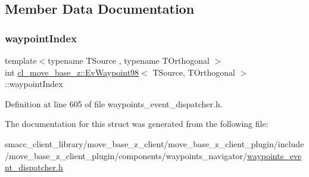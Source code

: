 \subsection{Member Data Documentation}
\mbox{\label{structcl__move__base__z_1_1EvWaypoint98_a8c62e06c9440d7e0e3d306c2279232ea}} 
\subsubsection{\texorpdfstring{waypoint\+Index}{waypointIndex}}
{\footnotesize\ttfamily template$<$typename T\+Source , typename T\+Orthogonal $>$ \\
int \hyperlink{structcl__move__base__z_1_1EvWaypoint98}{cl\+\_\+move\+\_\+base\+\_\+z\+::\+Ev\+Waypoint98}$<$ T\+Source, T\+Orthogonal $>$\+::waypoint\+Index}



Definition at line 605 of file waypoints\+\_\+event\+\_\+dispatcher.\+h.



The documentation for this struct was generated from the following file\+:\begin{DoxyCompactItemize}
\item 
smacc\+\_\+client\+\_\+library/move\+\_\+base\+\_\+z\+\_\+client/move\+\_\+base\+\_\+z\+\_\+client\+\_\+plugin/include/move\+\_\+base\+\_\+z\+\_\+client\+\_\+plugin/components/waypoints\+\_\+navigator/\hyperlink{waypoints__event__dispatcher_8h}{waypoints\+\_\+event\+\_\+dispatcher.\+h}\end{DoxyCompactItemize}
